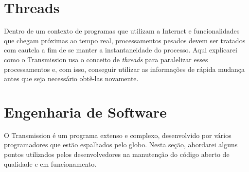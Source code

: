 \section{Threads}

Dentro de um contexto de programas que utilizam a Internet e funcionalidades que chegam
próximas ao tempo real, processamentos pesados devem ser tratados com cautela a fim de
se manter a instantaneidade do processo. Aqui explicarei como o Transmission usa o
conceito de \emph{threads} para paralelizar esses processamentos e, com isso, conseguir
utilizar as informações de rápida mudança antes que seja necessário obtê-las novamente.

\section{Engenharia de Software}

O Transmission é um programa extenso e complexo, desenvolvido por vários programadores
que estão espalhados pelo globo. Nesta seção, abordarei alguns pontos utilizados pelos
desenvolvedores na manutenção do código aberto de qualidade e em funcionamento.

\afterpage{\clearpage}
